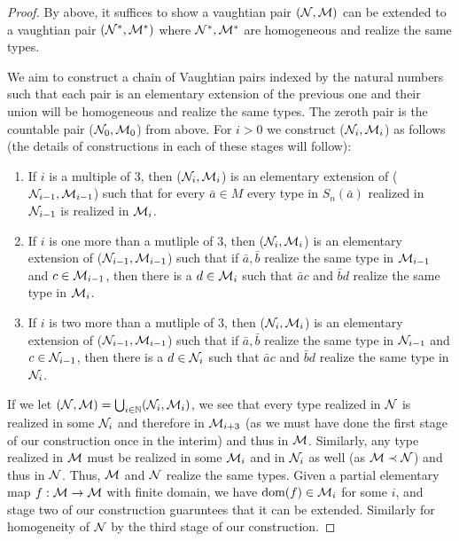 \begin{proof}
By above, it suffices to show a vaughtian pair \((\mathcal{N}, \mathcal{M})\) can be extended to a vaughtian pair \((\mathcal{N}^*, \mathcal{M}^*)\) where \(\mathcal{N}^*, \mathcal{M}^*\) are homogeneous and realize the same types. 

We aim to construct a chain of Vaughtian pairs indexed by the natural numbers such that each pair is an elementary extension of the previous one and their union will be homogeneous and realize the same types. 
The zeroth pair is the countable pair (\(\mathcal{N}_0, \mathcal{M}_0\)) from above. 
For \(i > 0\) we construct (\(\mathcal{N}_i, \mathcal{M}_i\)) as follows (the details of constructions in each of these stages will follow):
\begin{enumerate}
\item  If \(i\) is a multiple of 3, then (\(\mathcal{N}_i, \mathcal{M}_i\)) is an elementary extension of (\(\mathcal{N}_{i-1}, \mathcal{M}_{i-1}\)) such that for every \(\bar{a} \in M\) every type in \(S_n(\bar{a})\) realized in \(\mathcal{N}_{i-1}\) is realized in \(\mathcal{M}_i\). %
\item  If \(i\) is one more than a mutliple of 3, then (\(\mathcal{N}_i, \mathcal{M}_i\)) is an elementary extension of (\(\mathcal{N}_{i-1}, \mathcal{M}_{i-1}\)) such that if \(\bar{a}, \bar{b}\) realize the same type in \(\mathcal{M}_{i-1}\) and \(c \in \mathcal{M}_{i-1}\), then there is a \(d \in \mathcal{M}_i\) such that \(\bar{a}c\) and \(\bar{b}d\) realize the same type in \(\mathcal{M}_i\). 
\item If \(i\) is two more than a mutliple of 3, then (\(\mathcal{N}_i, \mathcal{M}_i\)) is an elementary extension of (\(\mathcal{N}_{i-1}, \mathcal{M}_{i-1}\)) such that if \(\bar{a}, \bar{b}\) realize the same type in \(\mathcal{N}_{i-1}\) and \(c \in \mathcal{N}_{i-1}\), then there is a \(d \in \mathcal{N}_i\) such that \(\bar{a}c\) and \(\bar{b}d\) realize the same type in \(\mathcal{N}_i\).
\end{enumerate}
If we let \((\mathcal{N}, \mathcal{M}) = \bigcup_{i \in \mathbb{N}}(\mathcal{N}_i, \mathcal{M}_i)\), we see that every type realized in \(\mathcal{N}\) is realized in some \(\mathcal{N}_i\) and therefore in \(\mathcal{M}_{i+3}\) (as we must have done the first stage of our construction once in the interim) and thus in \(\mathcal{M}\). 
Similarly, any type realized in \(\mathcal{M}\) must be realized in some \(\mathcal{M}_i\) and in \(\mathcal{N}_i\) as well (as \(\mathcal{M} \prec \mathcal{N}\)) and thus in \(\mathcal{N}\).
Thus, \(\mathcal{M}\) and  \(\mathcal{N}\) realize the same types.  
Given a partial elementary map \(f:\mathcal{M} \to \mathcal{M}\) with finite domain, we have \(\text{dom}(f) \in \mathcal{M}_i\) for some \(i\), and stage two of our construction guaruntees that it can be extended. 
Similarly for homogeneity of \(\mathcal{N}\) by the third stage of our construction. 


\end{proof}
